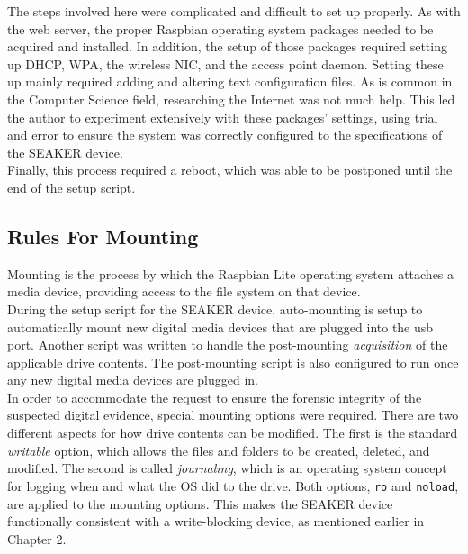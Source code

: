 \documentclass[12pt]{article}
\begin{document}
The steps involved here were complicated and difficult to set up properly.  As
with the web server, the proper Raspbian operating system packages needed to be
acquired and installed.  In addition, the setup of those packages required 
setting up DHCP, WPA, the wireless NIC, and the access point daemon.  Setting
these up mainly required adding and altering text configuration files.  
As is common in the Computer Science field, researching the Internet was not
much help.  This led the author to experiment extensively with these packages'
settings, using trial and error to ensure the system was correctly configured
to the specifications of the SEAKER device.\\

Finally, this process required a reboot, which was able to be postponed until
the end of the setup script.\\

\subsection{Rules For Mounting}

Mounting is the process by which the Raspbian Lite operating system attaches
a media device, providing access to the file system on that device.\\

During the setup script for the SEAKER device, auto-mounting is setup to
automatically mount new digital media devices that are plugged into the \gls{usb}
port.  Another script was written to handle the post-mounting {\em acquisition}
of the applicable drive contents.  The post-mounting script is also
configured to run once any new digital media devices are plugged in.\\

In order to accommodate the request to ensure the forensic integrity of the
suspected digital evidence, special mounting options were required.  There
are two different aspects for how drive contents can be modified.  The first is
the standard {\em writable} option, which allows the files and folders to be
created, deleted, and modified.  The second is called {\em journaling},
which is an operating system concept for logging when and what the OS 
did to the drive.  Both options, \verb|ro| and \verb|noload|, are applied to
the mounting options.  This makes the SEAKER device functionally consistent
with a write-blocking device, as mentioned earlier in Chapter 2.\\
\end{document}
